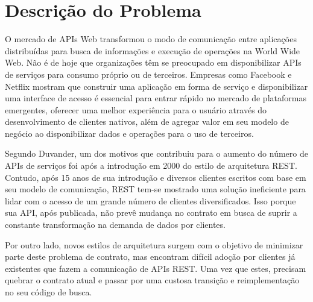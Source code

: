 \section[Descrição do Problema]{Descrição do Problema}

O mercado de APIs Web transformou o modo de comunicação entre aplicações distribuídas para busca de informações e execução de operações na World Wide Web. Não é de hoje que organizações têm se preocupado em disponibilizar APIs de serviços para consumo próprio ou de terceiros. Empresas como Facebook e Netflix mostram que construir uma aplicação em forma de serviço e disponibilizar uma interface de acesso é essencial para entrar rápido no mercado de plataformas emergentes, oferecer uma melhor experiência para o usuário através do desenvolvimento de clientes nativos, além de agregar valor em seu modelo de negócio ao disponibilizar dados e operações para o uso de terceiros. \cite{Art2016}

Segundo Duvander, um dos motivos que contribuiu para o aumento do número de APIs de serviços foi após a introdução em 2000 do estilo de arquitetura REST. Contudo, após 15 anos de sua introdução e diversos clientes escritos com base em seu modelo de comunicação, REST tem-se mostrado uma solução ineficiente para lidar com o acesso de um grande número de clientes diversificados. Isso porque sua API, após publicada, não prevê mudança no contrato em busca de suprir a constante transformação na demanda de dados por clientes. \cite{Duvander2013-2}

Por outro lado, novos estilos de arquitetura surgem com o objetivo de minimizar parte deste problema de contrato, mas encontram difícil adoção por clientes já existentes que fazem a comunicação de APIs REST. Uma vez que estes, precisam quebrar o contrato atual e passar por uma custosa transição e reimplementação no seu código de busca.
